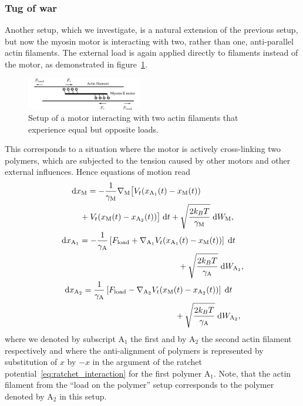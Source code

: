 \documentclass[aps,pre,twocolumn,showpacs,showkeys,superscriptaddress,floatfix]{revtex4-1}
\newcommand{\rmd}{{\mathrm d}}
\begin{document}
\subsubsection{Tug of war}
\label{sec:tug_of_war}
Another setup, which we investigate, is a natural extension of the previous setup, but now the myosin motor is interacting with two, rather than one, 
anti-parallel actin filaments. 
The external load is again applied directly to filaments instead of the motor, as demonstrated in figure~\ref{fig:tug_F_illustration}. 
\begin{figure}[t]
\centering
\includegraphics[width=0.45\textwidth,height=!]{tug_F_illustration}
\caption{
\label{fig:tug_F_illustration}
Setup of a motor interacting with two actin filaments that experience equal but opposite loads.
}
\end{figure}
This corresponds to a situation where the motor is actively cross-linking two polymers, which are subjected to the tension caused by other motors and other external influences.  
Hence equations of motion read
\begin{equation}
\begin{gathered}
\begin{multlined}[b][.45\textwidth]
\rmd x_\text{M} = 
- \frac{1}{\gamma_\text{M}} \nabla_\text{M} \bigl[ 
V_t(x_{\text{A}_1}(t) - x_\text{M}(t)) 
\\
+ V_t(x_\text{M}(t) - x_{\text{A}_2}(t)) 
\bigr] \; \rmd t 
+ \sqrt{ \frac{2 k_B T}{\gamma_\text{M}} } \; \rmd W_\text{M} ,
\end{multlined}\\
\begin{multlined}[b][.45\textwidth]
\rmd x_{\text{A}_1} = 
- \frac{1}{\gamma_\text{A}} \left[ F_\text{load} + \nabla_{\text{A}_1} V_t(x_{\text{A}_1}(t) - x_\text{M}(t)) \right] \; \rmd t 
\\
+ \sqrt{ \frac{2 k_B T}{\gamma_\text{A}} } \; \rmd W_{\text{A}_1} ,
\end{multlined}\\
\begin{multlined}[b][.45\textwidth]
\rmd x_{\text{A}_2} = 
\frac{1}{\gamma_\text{A}} \left[ F_\text{load} - \nabla_{\text{A}_2} V_t(x_\text{M}(t) - x_{\text{A}_2}(t)) \right] \; \rmd t 
\\
+ \sqrt{ \frac{2 k_B T}{\gamma_\text{A}} } \; \rmd W_{\text{A}_2} ,
\end{multlined}
\end{gathered}
\label{eq:eom_two_actins}
\end{equation}
where we denoted by subscript ${\text{A}_1}$ the first and by ${\text{A}_2}$ the second actin filament respectively
and where the anti-alignment of polymers is represented by substitution of $x$ by $-x$ in the argument of the ratchet potential~\eqref{eq:ratchet_interaction} for the first polymer $\text{A}_1$.
Note, that the actin filament from the ``load on the polymer'' setup corresponds to the polymer denoted by $\text{A}_2$ in this setup. 
\end{document}
